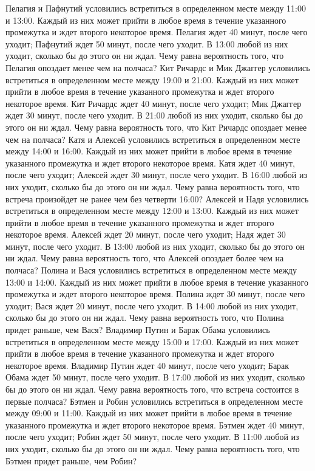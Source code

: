 Пелагия и Пафнутий условились встретиться в определенном месте между 11:00 и 13:00. Каждый из них может прийти в любое время в течение указанного промежутка и ждет второго некоторое время. Пелагия ждет 40 минут, после чего уходит; Пафнутий ждет 50 минут, после чего уходит. В 13:00 любой из них уходит, сколько бы до этого он ни ждал. Чему равна вероятность того, что Пелагия опоздает менее чем на полчаса?
Кит Ричардс и Мик Джаггер условились встретиться в определенном месте между 19:00 и 21:00. Каждый из них может прийти в любое время в течение указанного промежутка и ждет второго некоторое время. Кит Ричардс ждет 40 минут, после чего уходит; Мик Джаггер ждет 30 минут, после чего уходит. В 21:00 любой из них уходит, сколько бы до этого он ни ждал. Чему равна вероятность того, что Кит Ричардс опоздает менее чем на полчаса?
Катя и Алексей условились встретиться в определенном месте между 14:00 и 16:00. Каждый из них может прийти в любое время в течение указанного промежутка и ждет второго некоторое время. Катя ждет 40 минут, после чего уходит; Алексей ждет 30 минут, после чего уходит. В 16:00 любой из них уходит, сколько бы до этого он ни ждал. Чему равна вероятность того, что встреча произойдет не ранее чем без четверти 16:00?
Алексей и Надя условились встретиться в определенном месте между 12:00 и 13:00. Каждый из них может прийти в любое время в течение указанного промежутка и ждет второго некоторое время. Алексей ждет 20 минут, после чего уходит; Надя ждет 30 минут, после чего уходит. В 13:00 любой из них уходит, сколько бы до этого он ни ждал. Чему равна вероятность того, что Алексей опоздает более чем на полчаса?
Полина и Вася условились встретиться в определенном месте между 13:00 и 14:00. Каждый из них может прийти в любое время в течение указанного промежутка и ждет второго некоторое время. Полина ждет 30 минут, после чего уходит; Вася ждет 20 минут, после чего уходит. В 14:00 любой из них уходит, сколько бы до этого он ни ждал. Чему равна вероятность того, что Полина придет раньше, чем Вася?
Владимир Путин и Барак Обама условились встретиться в определенном месте между 15:00 и 17:00. Каждый из них может прийти в любое время в течение указанного промежутка и ждет второго некоторое время. Владимир Путин ждет 40 минут, после чего уходит; Барак Обама ждет 50 минут, после чего уходит. В 17:00 любой из них уходит, сколько бы до этого он ни ждал. Чему равна вероятность того, что встреча состоится в первые полчаса?
Бэтмен и Робин условились встретиться в определенном месте между 09:00 и 11:00. Каждый из них может прийти в любое время в течение указанного промежутка и ждет второго некоторое время. Бэтмен ждет 40 минут, после чего уходит; Робин ждет 50 минут, после чего уходит. В 11:00 любой из них уходит, сколько бы до этого он ни ждал. Чему равна вероятность того, что Бэтмен придет раньше, чем Робин?
